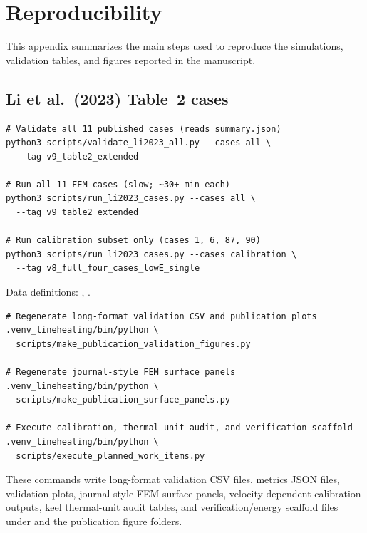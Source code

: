 \section{Reproducibility}
\label{sec:repro}

This appendix summarizes the main steps used to reproduce the simulations, validation tables, and figures reported in the manuscript.

\subsection{Li et al.\ (2023) Table~2 cases}
\begin{verbatim}
# Validate all 11 published cases (reads summary.json)
python3 scripts/validate_li2023_all.py --cases all \
  --tag v9_table2_extended

# Run all 11 FEM cases (slow; ~30+ min each)
python3 scripts/run_li2023_cases.py --cases all \
  --tag v9_table2_extended

# Run calibration subset only (cases 1, 6, 87, 90)
python3 scripts/run_li2023_cases.py --cases calibration \
  --tag v8_full_four_cases_lowE_single
\end{verbatim}

Data definitions: , .

\begin{verbatim}
# Regenerate long-format validation CSV and publication plots
.venv_lineheating/bin/python \
  scripts/make_publication_validation_figures.py

# Regenerate journal-style FEM surface panels
.venv_lineheating/bin/python \
  scripts/make_publication_surface_panels.py

# Execute calibration, thermal-unit audit, and verification scaffold
.venv_lineheating/bin/python \
  scripts/execute_planned_work_items.py
\end{verbatim}

These commands write long-format validation CSV files, metrics JSON files, validation plots, journal-style FEM surface panels, velocity-dependent calibration outputs, keel thermal-unit audit tables, and verification/energy scaffold files under  and the publication figure folders.

